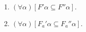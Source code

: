 \begin{enumerate}
\item $(\forall \alpha)[F'\alpha \subseteq F''\alpha]$.
\item $(\forall \alpha)[F_a'\alpha \subseteq F_a''\alpha]$.
\end{enumerate}
